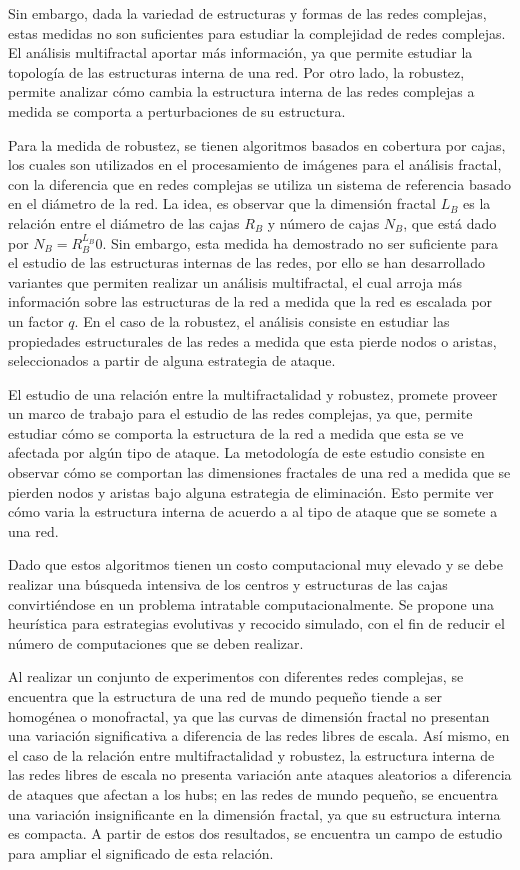 Sin embargo, dada la variedad de estructuras y formas de las redes complejas, estas medidas no son suficientes para estudiar la complejidad de redes complejas\cite{Song2005}. El análisis multifractal aportar más información\cite{Li2014}, ya que permite estudiar la topología de las estructuras interna de una red. Por otro lado, la robustez\cite{Schneider2011}, permite analizar cómo cambia la estructura interna de las redes complejas a medida se comporta a perturbaciones de su estructura.

Para la medida de robustez, se tienen algoritmos basados en cobertura por cajas\cite{Song2007}, los cuales son utilizados en el procesamiento de imágenes para el análisis fractal, con la diferencia que en redes complejas se utiliza un sistema de referencia basado en el diámetro de la red. La idea, es observar que la dimensión fractal $L_B$ es la relación entre el diámetro de las cajas $R_B$ y número de cajas $N_B$, que está dado por $N_B=R_{B}^{L_B}0$. Sin embargo, esta medida ha demostrado no ser suficiente para el estudio de las estructuras internas de las redes\cite{Wang2012}, por ello se han desarrollado variantes que permiten realizar un análisis multifractal, el cual arroja más información sobre las estructuras de la red a medida que la red es escalada por un factor $q$. En el caso de la robustez, el análisis consiste en estudiar las propiedades estructurales de las redes a medida que esta pierde nodos o aristas, seleccionados a partir de alguna estrategia de ataque.

El estudio de una relación entre la multifractalidad y robustez, promete proveer un marco de trabajo para el estudio de las redes complejas, ya que, permite estudiar cómo se comporta la estructura de la red a medida que esta se ve afectada por algún tipo de ataque. La metodología de este estudio consiste en observar cómo se comportan las dimensiones fractales de una red a medida que se pierden nodos y aristas bajo alguna estrategia de eliminación. Esto permite ver cómo varia la estructura interna de acuerdo a al tipo de ataque que se somete a una red.

Dado que estos algoritmos tienen un costo computacional muy elevado y se debe realizar una búsqueda intensiva de los centros y estructuras de las cajas convirtiéndose en un problema intratable computacionalmente. Se propone una heurística para estrategias evolutivas y recocido simulado, con el fin de reducir el número de computaciones que se deben realizar.

Al realizar un conjunto de experimentos con diferentes redes complejas, se encuentra que la estructura de una red de mundo pequeño tiende a ser homogénea o monofractal, ya que las curvas de dimensión fractal no presentan una variación significativa a diferencia de las redes libres de escala. Así mismo, en el caso de la relación entre multifractalidad y robustez, la estructura interna de las redes libres de escala no presenta variación ante ataques aleatorios a diferencia de ataques que afectan a los hubs; en las redes de mundo pequeño, se encuentra una variación insignificante en la dimensión fractal, ya que su estructura interna es compacta. A partir de estos dos resultados, se encuentra un campo de estudio para ampliar el significado de esta relación.

